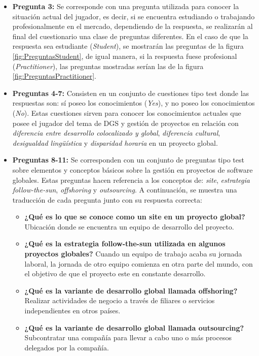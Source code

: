 \begin{itemize}
	\item \textbf{Pregunta 3:} Se corresponde con una pregunta utilizada para conocer la situación actual del jugador, es decir, si se encuentra estudiando o trabajando profesionalmente en el mercado, dependiendo de la respuesta, se realizarán al final del cuestionario una clase de preguntas diferentes. En el caso de que la respuesta sea estudiante (\emph{Student}), se mostrarán las preguntas de la figura \ref{fig:PreguntasStudent}, de igual manera, si la respuesta fuese profesional (\emph{Practitioner}), las preguntas mostradas serían las de la figura \ref{fig:PreguntasPractitioner}.
	\item \textbf{Preguntas 4-7:} Consisten en un conjunto de cuestiones tipo test donde las respuestas son: sí poseo los conocimientos (\emph{Yes}), y no poseo los conocimientos (\emph{No}). Estas cuestiones sirven para conocer los conocimientos actuales que posee el jugador del tema de DGS y gestión de proyectos en relación con \emph{diferencia entre desarrollo colocalizado y global}, \emph{diferencia cultural}, \emph{desigualdad lingüística} y \emph{disparidad horaria} en un proyecto global.
	\item \textbf{Preguntas 8-11:} Se corresponden con un conjunto de preguntas tipo test sobre elementos y conceptos básicos sobre la gestión en proyectos de software globales. Estas preguntas hacen referencia a los conceptos de: \emph{site}, \emph{estrategia follow-the-sun}, \emph{offshoring} y \emph{outsourcing}. A continuación, se muestra una traducción de cada pregunta junto con su respuesta correcta:
	\begin{itemize}
		\item \textbf{¿Qué es lo que se conoce como un site en un proyecto global?} Ubicación donde se encuentra un equipo de desarrollo del proyecto.
		\item \textbf{¿Qué es la estrategia follow-the-sun utilizada en algunos proyectos globales?} Cuando un equipo de trabajo acaba su jornada laboral, la jornada de otro equipo comienza en otra parte del mundo, con el objetivo de que el proyecto este en constante desarrollo.
		\item \textbf{¿Qué es la variante de desarrollo global llamada offshoring?} Realizar actividades de negocio a través de filiares o servicios independientes en otros países.
		\item \textbf{¿Qué es la variante de desarrollo global llamada outsourcing?} Subcontratar una compañía para llevar a cabo uno o más procesos delegados por la compañía.
	\end{itemize}
\end{itemize}

